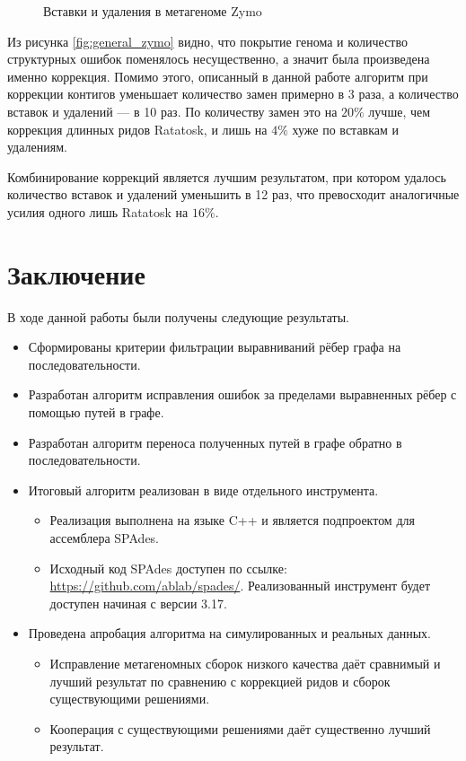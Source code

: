 \documentclass[14pt]{matmex-diploma-custom}
\begin{document}
\begin{figure}[h!]
    
    \caption{Вставки и удаления в метагеноме Zymo}
    \label{fig:indels_zymo}
\end{figure}

Из рисунка \ref{fig:general_zymo} видно, что покрытие генома и количество структурных ошибок поменялось несущественно, а значит была произведена именно коррекция. Помимо этого, описанный в данной работе алгоритм при коррекции контигов уменьшает количество замен примерно в 3 раза, а количество вставок и удалений --- в 10 раз. По количеству замен это на $20\%$ лучше, чем коррекция длинных ридов Ratatosk, и лишь на $4\%$ хуже по вставкам и удалениям.

Комбинирование коррекций является лучшим результатом, при котором удалось количество вставок и удалений уменьшить в 12 раз, что превосходит аналогичные усилия одного лишь Ratatosk на $16\%$.

\newpage
\section*{Заключение}
В ходе данной работы были получены следующие результаты.
\begin{itemize}
    \item Сформированы критерии фильтрации выравниваний рёбер графа на последовательности.
    \item Разработан алгоритм исправления ошибок за пределами выравненных рёбер с помощью путей в графе.
    \item Разработан алгоритм переноса полученных путей в графе обратно в последовательности.
    \item Итоговый алгоритм реализован в виде отдельного инструмента.
    \begin{itemize}
        \item Реализация выполнена на языке C++ и является подпроектом для ассемблера SPAdes.
        \item \begin{sloppypar} Исходный код SPAdes доступен по ссылке: \mbox{\url{https://github.com/ablab/spades/}}. Реализованный инструмент будет доступен начиная с версии 3.17. \end{sloppypar}
    \end{itemize}
    \item Проведена апробация алгоритма на симулированных и реальных данных.
    \begin{itemize}
        \item Исправление метагеномных сборок низкого качества даёт сравнимый и лучший результат по сравнению с коррекцией ридов и сборок существующими решениями.
        \item Кооперация с существующими решениями даёт существенно лучший результат.
    \end{itemize}

\end{itemize}
\end{document}
